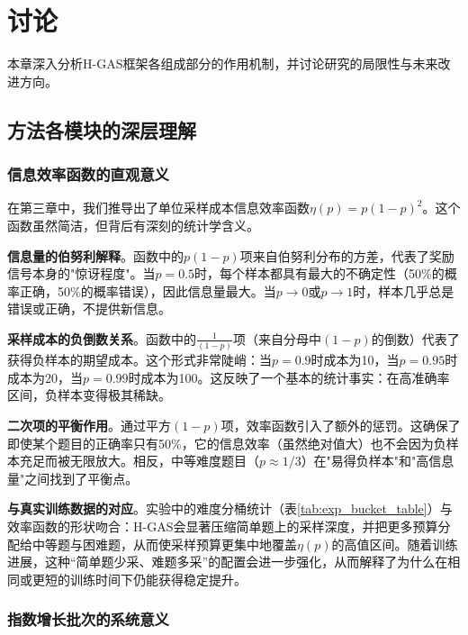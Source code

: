 \chapter{讨论}
\label{chap:discussion}

本章深入分析H-GAS框架各组成部分的作用机制，并讨论研究的局限性与未来改进方向。

\section{方法各模块的深层理解}
\label{sec:deep_understanding}

\subsection{信息效率函数的直观意义}
\label{subsec:efficiency_intuition}

在第三章中，我们推导出了单位采样成本信息效率函数$\eta(p) = p(1-p)^2$。这个函数虽然简洁，但背后有深刻的统计学含义。

\textbf{信息量的伯努利解释}。函数中的$p(1-p)$项来自伯努利分布的方差，代表了奖励信号本身的"惊讶程度"。当$p = 0.5$时，每个样本都具有最大的不确定性（50\%的概率正确，50\%的概率错误），因此信息量最大。当$p \to 0$或$p \to 1$时，样本几乎总是错误或正确，不提供新信息。

\textbf{采样成本的负倒数关系}。函数中的$\frac{1}{(1-p)}$项（来自分母中$(1-p)$的倒数）代表了获得负样本的期望成本。这个形式非常陡峭：当$p = 0.9$时成本为10，当$p = 0.95$时成本为20，当$p = 0.99$时成本为100。这反映了一个基本的统计事实：在高准确率区间，负样本变得极其稀缺。

\textbf{二次项的平衡作用}。通过平方$(1-p)$项，效率函数引入了额外的惩罚。这确保了即使某个题目的正确率只有50\%，它的信息效率（虽然绝对值大）也不会因为负样本充足而被无限放大。相反，中等难度题目（$p \approx 1/3$）在"易得负样本"和"高信息量"之间找到了平衡点。

\textbf{与真实训练数据的对应}。实验中的难度分桶统计（表\ref{tab:exp_bucket_table}）与效率函数的形状吻合：H-GAS会显著压缩简单题上的采样深度，并把更多预算分配给中等题与困难题，从而使采样预算更集中地覆盖$\eta(p)$的高值区间。随着训练进展，这种“简单题少采、难题多采”的配置会进一步强化，从而解释了为什么在相同或更短的训练时间下仍能获得稳定提升。

\subsection{指数增长批次的系统意义}
\label{subsec:ebs_system_significance}

